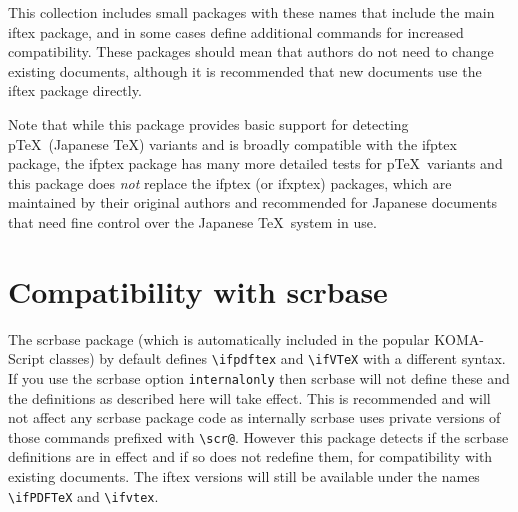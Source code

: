 \documentclass{article}
\begin{document}
This collection includes small packages with these names that include
the main \textsf{iftex} package, and in some cases define additional
commands for increased compatibility. These packages should mean that
authors do not need to change existing documents, although it is
recommended that new documents use the \textsf{iftex} package
directly.


Note that while this package provides basic support for detecting
p\TeX\ (Japanese \TeX) variants and is broadly compatible with the
\textsf{ifptex} package, the \textsf{ifptex} package has many more detailed
tests for p\TeX\ variants and this package does \emph{not} replace the
\textsf{ifptex} (or \textsf{ifxptex}) packages, which are maintained
by their original authors and recommended for Japanese documents that
need fine control over the Japanese \TeX\ system in use.

\section{Compatibility with \textsf{scrbase}}
The \textsf{scrbase} package (which is automatically included in the
popular \textsf{KOMA-Script} classes) by default defines
\verb|\ifpdftex| and \verb|\ifVTeX| with a different syntax.  If you
use the \textsf{scrbase} option \verb|internalonly| then
\textsf{scrbase} will not define these and the definitions as
described here will take effect. This is recommended and will not
affect any \textsf{scrbase} package code as internally
\textsf{scrbase} uses private versions of those commands prefixed with
\verb|\scr@|.  However this package detects if the \textsf{scrbase}
definitions are in effect and if so does not redefine them, for
compatibility with existing documents. The \textsf{iftex} versions
will still be available under the names \verb|\ifPDFTeX| and
\verb|\ifvtex|.
\end{document}
